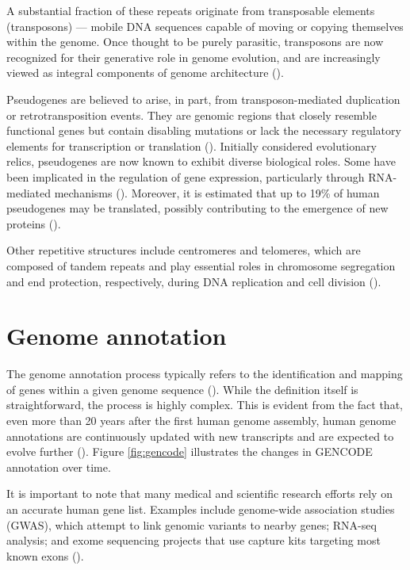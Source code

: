 A substantial fraction of these repeats originate from transposable elements (transposons) —
mobile DNA sequences capable of moving or copying themselves within the genome.
Once thought to be purely parasitic, transposons are now recognized for their generative role in genome evolution,
and are increasingly viewed as integral components of genome architecture (\cite{Fedoroff2012}).

Pseudogenes are believed to arise, in part, from transposon-mediated duplication or retrotransposition events.
They are genomic regions that closely resemble functional genes but contain disabling mutations or lack the necessary
regulatory elements for transcription or translation (\cite{Qian2022}).
Initially considered evolutionary relics, pseudogenes are now known to exhibit diverse biological roles.
Some have been implicated in the regulation of gene expression,
particularly through RNA-mediated mechanisms (\cite{Tutar2012}).
Moreover, it is estimated that up to 19\% of human pseudogenes may be translated,
possibly contributing to the emergence of new proteins (\cite{Qian2022}).

Other repetitive structures include centromeres and telomeres,
which are composed of tandem repeats and play essential roles in chromosome segregation and end protection, respectively,
during DNA replication and cell division (\cite{Alberts2022}).

\section{Genome annotation}

The genome annotation process typically refers to the identification and mapping of genes within a given genome sequence (\cite{Guigo2023}).
While the definition itself is straightforward, the process is highly complex.
This is evident from the fact that, even more than 20 years after the first human genome assembly,
human genome annotations are continuously updated with new transcripts and are expected to evolve further (\cite{Mudge2024}).
Figure \ref{fig:gencode} illustrates the changes in GENCODE annotation over time.

It is important to note that many medical and scientific research efforts rely on an accurate human gene list.
Examples include genome-wide association studies (GWAS), which attempt to link genomic variants to nearby genes;
RNA-seq analysis; and exome sequencing projects that use capture kits targeting most known exons (\cite{Pertea2018}).

